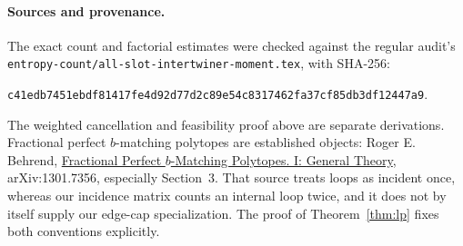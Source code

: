 \documentclass[11pt]{article}
\begin{document}
\paragraph{Sources and provenance.}
The exact count and factorial estimates were checked against the
regular audit's \texttt{entropy-count/all-slot-intertwiner-moment.tex},
with SHA-256:
\par\noindent
\texttt{c41edb7451ebdf81417fe4d92d77d2c89e54c8317462fa37cf85db3df12447a9}.
\par\noindent
The weighted cancellation and feasibility proof above are separate
derivations. Fractional perfect $b$-matching polytopes are established
objects: Roger E. Behrend,
\href{https://arxiv.org/abs/1301.7356}{Fractional Perfect $b$-Matching
Polytopes. I: General Theory}, arXiv:1301.7356, especially Section~3.
That source treats loops as incident once, whereas our incidence matrix
counts an internal loop twice, and it does not by itself supply our
edge-cap specialization. The proof of Theorem~\ref{thm:lp} fixes both
conventions explicitly.
\end{document}
